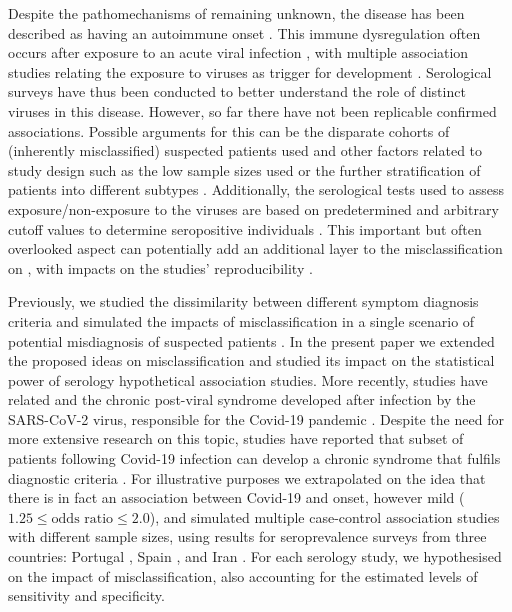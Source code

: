 Despite the pathomechanisms of \cfs remaining unknown, the disease has been described as having an autoimmune onset \citep{lorussoImmunologicalAspectsChronic2009, sotznyMyalgicEncephalomyelitisChronic2018}. This immune dysregulation often occurs after exposure to an acute viral infection \citep{rasa2018ChronicViral, blomberg2018InfectionEliciteda, chu2019OnsetPatterns}, with multiple association studies relating the exposure to viruses as trigger for \cfs development \citep{bansalChronicFatigueSyndrome2012, sotznyMyalgicEncephalomyelitisChronic2018}. Serological surveys have thus been conducted to better understand the role of distinct viruses in this disease. However, so far there have not been replicable confirmed associations. Possible arguments for this can be the disparate cohorts of (inherently misclassified) suspected \cfs patients used and other factors related to study design such as the low sample sizes used \citep{scheibenbogen2017EuropeanME} or the further stratification of patients into different subtypes \citep{jason2005ChronicFatigue}. Additionally, the serological tests used to assess exposure/non-exposure to the viruses are based on predetermined and arbitrary cutoff values to determine seropositive individuals \citep{scheibenbogen2017EuropeanME}. This important but often overlooked aspect can potentially add an additional layer to the misclassification on \cfs, with impacts on the studies' reproducibility \citep{domingues2021HerpesvirusesSerologya}.

Previously, we studied the dissimilarity between different symptom diagnosis criteria and simulated the impacts of misclassification in a single scenario of potential misdiagnosis of suspected patients \citep{malato2021Statisticalchallenges}. In the present paper we extended the proposed ideas on misclassification and studied its impact on the statistical power of serology hypothetical association studies. More recently, studies have related \cfs and the chronic post-viral syndrome developed after infection by the SARS-CoV-2 virus, responsible for the Covid-19 pandemic \citep{komaroffWillCOVID19Lead2021}. Despite the need for more extensive research on this topic, studies have reported that subset of patients following Covid-19 infection can develop a chronic syndrome that fulfils \cfs diagnostic criteria \citep{kedorChronicCOVID19Syndrome2021}. For illustrative purposes we extrapolated on the idea that there is in fact an association between Covid-19 and \cfs onset, however mild ($1.25 \leq \text{odds ratio} \leq 2.0$), and simulated multiple case-control association studies with different sample sizes, using results for seroprevalence surveys from three countries: Portugal \citep{kislayaSeroprevalenceSARSCoV2Infection2021}, Spain \citep{pollanPrevalenceSARSCoV2Spain2020}, and Iran \citep{khalagiPrevalenceCOVID19Iran2021}. For each serology study, we hypothesised on the impact of misclassification, also accounting for the estimated levels of sensitivity and specificity.

